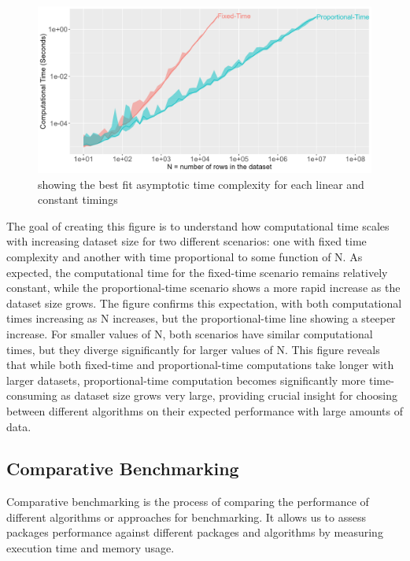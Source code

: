 \begin{figure}[H]
    \centering
    \includegraphics[width=0.8\linewidth]{figures/best.list.R.png}
    \caption{showing the best fit asymptotic time complexity for each linear and constant timings}
    \label{fig:label1}
\end{figure}

\noindent The goal of creating this figure is to understand how computational time scales with increasing dataset size for two different scenarios: one with fixed time complexity and another with time proportional to some function of N. As expected, the computational time for the fixed-time scenario remains relatively constant, while the proportional-time scenario shows a more rapid increase as the dataset size grows. The figure confirms this expectation, with both computational times increasing as N increases, but the proportional-time line showing a steeper increase. For smaller values of N, both scenarios have similar computational times, but they diverge significantly for larger values of N. This figure reveals that while both fixed-time and proportional-time computations take longer with larger datasets, proportional-time computation becomes significantly more time-consuming as dataset size grows very large, providing crucial insight for choosing between different algorithms on their expected performance with large amounts of data.\\


\subsection{Comparative Benchmarking}

\noindent Comparative benchmarking is the process of comparing the performance of different algorithms or approaches for benchmarking. It allows us to assess packages performance against different packages and algorithms by measuring execution time and memory usage.\\

